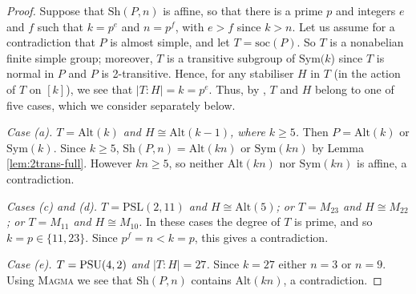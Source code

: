 \documentclass[12pt]{amsart}
\theoremstyle{remark}
\theoremstyle{definition}
\newcommand{\PSL}{\mathrm{PSL}}
\newcommand{\sym}{\mathrm{Sym}}
\newcommand{\alt}{\mathrm{Alt}}
\newcommand{\sh}{\mathrm{Sh}}
\newcommand{\PSU}{\textnormal{PSU}}
\begin{document}
\begin{proof}
Suppose that $\sh(P,n)$ is affine, so that there is a prime $p$ and integers $e$ and $f$ such that $k = p^e$ and $n = p^f$, with $e > f$ since $k > n$. Let us assume for a contradiction that $P$ is almost simple, and let $T = \mathrm{soc}(P)$. So $T$ is a nonabelian finite simple group; moreover, $T$ is a transitive subgroup of $\sym(k$) since $T$ is normal in $P$ and $P$ is 2-transitive. Hence, for any stabiliser $H$ in $T$ (in the action of $T$ on $[k]$), we see that $|T:H| = k = p^e$. Thus, by \cite[Theorem 1]{guralnickppower}, $T$ and $H$ belong to one of five cases, which we consider separately below.

\medskip\noindent
\emph{Case (a). $T = \alt(k)$ and $H \cong \alt(k-1)$, where $k \geqslant 5$.} Then $P = \alt(k)$ or $\sym(k)$. Since $k \geqslant 5$, $\sh(P,n) = \alt(kn)$ or $\sym(kn)$ by Lemma \ref{lem:2trans-full}. However $kn \geqslant 5$, so neither $\alt(kn)$ nor $\sym(kn)$ is affine, a contradiction.
 
\medskip\noindent
\emph{Cases (c) and (d). $T = \PSL(2,11)$ and $H \cong \alt(5)$; or $T = M_{23}$ and $H \cong M_{22}$; or $T = M_{11}$ and $H \cong M_{10}$.} In these cases the degree of $T$ is prime, and so $k = p \in \{11,23\}$. Since $p^f = n < k = p$, this gives a contradiction.

\medskip\noindent
\emph{Case (e). $T = \PSU(4,2)$ and $|T:H| = 27$.} Since $k = 27$ either $n=3$ or $n=9$. Using \textsc{Magma} \cite{magma} we see that $\sh(P,n)$ contains $\alt(kn)$, a contradiction.


\end{proof}
\end{document}
